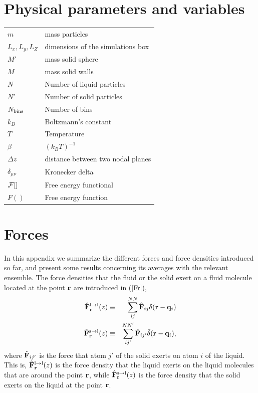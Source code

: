 \documentclass[b5paper,openright,11pt]{book}
\begin{document}
\begin{appendices}
\chapter{Physical parameters and variables}
\begin{tabular}{l l}
    $m$ & mass particles \\
    $L_x, L_y, L_Z$ & dimensions of the simulations box \\
    $M'$ & mass solid sphere \\
    $M$ & mass solid walls \\
    $N$ & Number of liquid particles \\
    $N'$ & Number of solid particles \\
    $N_{\rm bins}$ & Number of bins \\
    $k_B$ & Boltzmann's constant \\
    $T$ & Temperature \\
    $\beta$ & $(k_BT)^{-1}$ \\
    $\Delta z$ & distance between two nodal planes \\
    $\delta_{\mu\nu}$ & Kronecker delta \\
    ${\cal F}[]$ & Free energy functional \\
    $F()$ & Free energy function \\
\end{tabular}

\chapter{Forces}  
\label{Ap:Forces}
In this appendix we summarize the different forces and force densities
introduced so far, and present  some results  concerning its
averages  with the relevant  ensemble.  The  force densities  that the
fluid or the solid exert on a fluid molecule located at the point ${\bf
  r}$ are introduced in (\ref{Fr}),
\begin{eqnarray}
  \hat{\bf F}^{\rm l\to l}_{\bf r}(z) &\equiv& \sum^{NN}_{ij}\hat{\bf F}_{ij}\bar{\delta}({\bf r}-{\bf q}_i)
\nonumber\\
\hat{\bf F}^{\rm s\to l}_{\bf r}(z) &\equiv& \sum^{NN'}_{ij'}\hat{\bf F}_{ij'}\bar{\delta}({\bf r}-{\bf q}_i),
\label{Fr_ap}
\end{eqnarray}
where $\hat{\bf  F}_{ij'}$ is the  force that  atom $j'$ of  the solid
exerts on  atom $i$ of  the liquid.   This is, $\hat{\bf  F}^{\rm l\to
  l}_{\bf r}(z) $  is the force density that the  liquid exerts on the
liquid molecules that are around  the point ${\bf r}$, while $\hat{\bf
  F}^{\rm  s\to l}_{\bf  r}(z)$ is  the force  density that  the solid
exerts on the liquid at the point ${\bf r}$.


\end{appendices}
\end{document}
